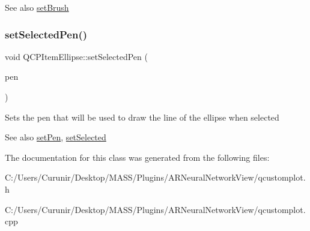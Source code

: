 \begin{DoxySeeAlso}{See also}
\hyperlink{class_q_c_p_item_ellipse_a49fc74e6965834e873d027d026def798}{set\+Brush} 
\end{DoxySeeAlso}
\mbox{\label{class_q_c_p_item_ellipse_a6c542fba1dc918041c583f58a50dde99}} 
\subsubsection{\texorpdfstring{set\+Selected\+Pen()}{setSelectedPen()}}
{\footnotesize\ttfamily void Q\+C\+P\+Item\+Ellipse\+::set\+Selected\+Pen (\begin{DoxyParamCaption}\item[{const Q\+Pen \&}]{pen }\end{DoxyParamCaption})}

Sets the pen that will be used to draw the line of the ellipse when selected

\begin{DoxySeeAlso}{See also}
\hyperlink{class_q_c_p_item_ellipse_adb81a663ed2420fcfa011e49f678d1a6}{set\+Pen}, \hyperlink{class_q_c_p_abstract_item_a203de94ad586cc44d16c9565f49d3378}{set\+Selected} 
\end{DoxySeeAlso}


The documentation for this class was generated from the following files\+:\begin{DoxyCompactItemize}
\item 
C\+:/\+Users/\+Curunir/\+Desktop/\+M\+A\+S\+S/\+Plugins/\+A\+R\+Neural\+Network\+View/qcustomplot.\+h\item 
C\+:/\+Users/\+Curunir/\+Desktop/\+M\+A\+S\+S/\+Plugins/\+A\+R\+Neural\+Network\+View/qcustomplot.\+cpp\end{DoxyCompactItemize}
